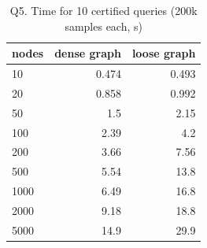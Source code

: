 \begin{table}[H]\centering\small
\caption{Q5. Time for 10 certified queries (200k samples each, s)}\label{tab:q5t}

\begin{tabular}{lrr}\toprule
nodes & dense graph & loose graph \\ \midrule
10 & 0.474 & 0.493 \\
20 & 0.858 & 0.992 \\
50 & 1.5 & 2.15 \\
100 & 2.39 & 4.2 \\
200 & 3.66 & 7.56 \\
500 & 5.54 & 13.8 \\
1000 & 6.49 & 16.8 \\
2000 & 9.18 & 18.8 \\
5000 & 14.9 & 29.9 \\
\bottomrule\end{tabular}
\end{table}
